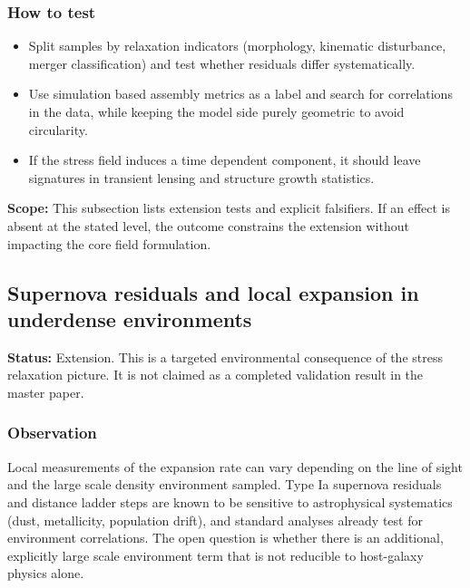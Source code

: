 \documentclass[11pt,a4paper]{article}
\begin{document}
\subsubsection{How to test}
\begin{itemize}
  \item Split samples by relaxation indicators (morphology, kinematic disturbance, merger classification) and test whether residuals differ systematically.
  \item Use simulation based assembly metrics as a label and search for correlations in the data, while keeping the model side purely geometric to avoid circularity.
  \item If the stress field induces a time dependent component, it should leave signatures in transient lensing and structure growth statistics.
\end{itemize}

\begin{mdframed}[linecolor=accent,linewidth=0.5pt,backgroundcolor=callout-bg,leftline=true,rightline=true,topline=true,bottomline=true,innerleftmargin=8pt,innerrightmargin=8pt,innertopmargin=6pt,innerbottommargin=6pt]
\textbf{Scope:} This subsection lists extension tests and explicit falsifiers. If an effect is absent at the stated level, the outcome constrains the extension without impacting the core field formulation.
\end{mdframed}

\subsection{Supernova residuals and local expansion in underdense environments}
\begin{mdframed}[linecolor=accent,linewidth=0.5pt,backgroundcolor=callout-bg,leftline=true,rightline=true,topline=true,bottomline=true,innerleftmargin=8pt,innerrightmargin=8pt,innertopmargin=6pt,innerbottommargin=6pt]
\textbf{Status:} Extension. This is a targeted environmental consequence of the stress relaxation picture. It is not claimed as a completed validation result in the master paper.
\end{mdframed}

\subsubsection{Observation}
Local measurements of the expansion rate can vary depending on the line of sight and the large scale density environment sampled. 
Type Ia supernova residuals and distance ladder steps are known to be sensitive to astrophysical systematics (dust, metallicity, population drift), 
and standard analyses already test for environment correlations. The open question is whether there is an additional, explicitly large scale 
environment term that is not reducible to host-galaxy physics alone.
\end{document}
